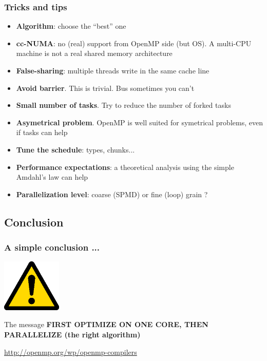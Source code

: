 \begin{frame}
\frametitle{Tricks and tips}

\begin{block}{}
\begin{itemize}
\item{\textbf{Algorithm}: choose the ``best'' one}
\item{\textbf{cc-NUMA}: no (real) support from OpenMP side (but OS). A multi-CPU machine is not a real shared memory architecture}
\item{\textbf{False-sharing}: multiple threads write in the same cache line}
\item{\textbf{Avoid barrier}. This is trivial. Bus sometimes you can't}
\item{\textbf{Small number of tasks}. Try to reduce the number of forked tasks}
\item{\textbf{Asymetrical problem}. OpenMP is well suited for symetrical problems, even if tasks can help}
\item{\textbf{Tune the schedule}: types, chunks...}
\item{\textbf{Performance expectations}: a theoretical analysis using the simple Amdahl's law can help}
\item{\textbf{Parallelization level}: coarse (SPMD) or fine (loop) grain ?}
\end{itemize}
\end{block}

\end{frame}




\subsection{Conclusion}

\begin{frame}
\frametitle{A simple conclusion ...}
\begin{center}
        {\includegraphics[height=2.5cm]{Day1/images/warning.png}}
\begin{alertblock}{The message}
        \textbf{FIRST OPTIMIZE ON ONE CORE, THEN PARALLELIZE (the right algorithm)}
\end{alertblock}

\url{http://openmp.org/wp/openmp-compilers}

\end{center}

\end{frame}






